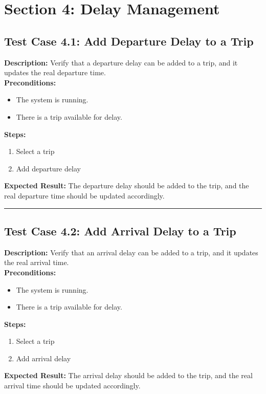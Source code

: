 \documentclass{article}
\begin{document}
\pagebreak

\section{Section 4: Delay Management}
\bigskip
\bigskip
\subsection{Test Case 4.1: Add Departure Delay to a Trip}

\textbf{Description:} Verify that a departure delay can be added to a trip, and it updates the real departure time.\\
\textbf{Preconditions:}
\begin{itemize}
  \item The system is running.
  \item There is a trip available for delay.
\end{itemize}
\textbf{Steps:}
\begin{enumerate}
  \item Select a trip
  \item Add departure delay
\end{enumerate}
\textbf{Expected Result:} The departure delay should be added to the trip, and the real departure time should be updated accordingly.

\bigskip
\hrule
\bigskip

\subsection{Test Case 4.2: Add Arrival Delay to a Trip}

\textbf{Description:} Verify that an arrival delay can be added to a trip, and it updates the real arrival time.\\
\textbf{Preconditions:}
\begin{itemize}
  \item The system is running.
  \item There is a trip available for delay.
\end{itemize}
\textbf{Steps:}
\begin{enumerate}
    \item Select a trip
    \item Add arrival delay
\end{enumerate}
\textbf{Expected Result:} The arrival delay should be added to the trip, and the real arrival time should be updated accordingly.
\end{document}
